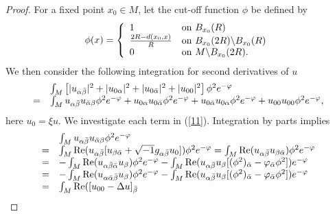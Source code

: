 \documentclass[10pt,a4paper]{amsart}
\begin{document}
\begin{proof}
For a fixed point $x_{0}\in M$, let the cut-off function $\phi$ be defined by%
\[%
\begin{array}
[c]{c}%
\phi(x)=\left\{
\begin{array}
[c]{ll}%
1 & \mathrm{on}\text{ }B_{x_{0}}(R)\\
\frac{2R-d(x_{0},x)}{R} & \mathrm{on}\text{ }B_{x_{0}}(2R)\backslash B_{x_{0}%
}(R)\\
0 & \mathrm{on}\text{ }M\backslash B_{x_{0}}(2R).
\end{array}
\right.
\end{array}
\]
We then consider the following integration for second derivatives of $u$
\begin{equation}%
\begin{array}
[c]{ll}
& \int_{M}\left[  |u_{\alpha\bar{\beta}}|^{2}+|u_{0\alpha}|^{2}+|u_{0\bar
{\alpha}}|^{2}+|u_{00}|^{2}\right]  \phi^{2}e^{-\varphi}\\
= & \int_{M}u_{\alpha\bar{\beta}}u_{\bar{\alpha}\beta}\phi^{2}e^{-\varphi
}+u_{0\alpha}u_{0\bar{\alpha}}\phi^{2}e^{-\varphi}+u_{0\bar{\alpha}}%
u_{0\alpha}\phi^{2}e^{-\varphi}+u_{00}u_{00}\phi^{2}e^{-\varphi},
\end{array}
\label{11}%
\end{equation}
here $u_{0}=\xi u.$ We investigate each term in (\ref{11}). Integration by
parts implies
\begin{equation}%
\begin{array}
[c]{ll}
& \int_{M}u_{\alpha\bar{\beta}}u_{\bar{\alpha}\beta}\phi^{2}e^{-\varphi}\\
= & \int_{M}\mathrm{\operatorname{Re}}(u_{\alpha\bar{\beta}}[u_{\beta
\bar{\alpha}}+\sqrt{-1}g_{\alpha\bar{\beta}}u_{0}])\phi^{2}e^{-\varphi}%
=\int_{M}\mathrm{\operatorname{Re}}(u_{\alpha\bar{\beta}}u_{\beta\bar{\alpha}%
})\phi^{2}e^{-\varphi}\\
= & -\int_{M}\mathrm{\operatorname{Re}}(u_{\alpha\bar{\beta}\bar{\alpha}%
}u_{\beta})\phi^{2}e^{-\varphi}-\int_{M}\mathrm{\operatorname{Re}}%
(u_{\alpha\bar{\beta}}u_{\beta}[(\phi^{2})_{\bar{\alpha}}-\varphi_{\bar
{\alpha}}\phi^{2}])e^{-\varphi}\\
= & -\int_{M}\mathrm{\operatorname{Re}}(u_{\alpha\bar{\alpha}\bar{\beta}%
}u_{\beta})\phi^{2}e^{-\varphi}-\int_{M}\mathrm{\operatorname{Re}}%
(u_{\alpha\bar{\beta}}u_{\beta}[(\phi^{2})_{\bar{\alpha}}-\varphi_{\bar
{\alpha}}\phi^{2}])e^{-\varphi}\\
= & \int_{M}\mathrm{\operatorname{Re}}([u_{00}-\Delta u]_{\bar{\beta}}%

\end{array}
\end{equation}
\end{proof}
\end{document}
